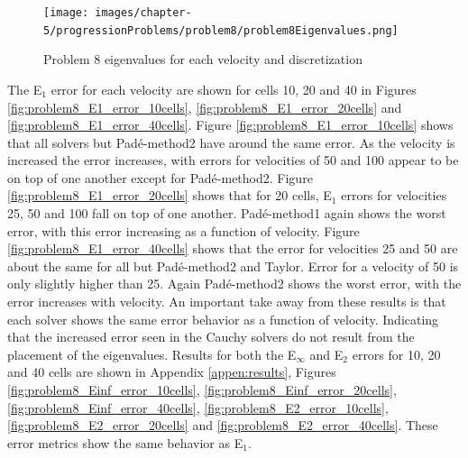 \clearpage

\begin{figure}[p]
    \centering
    \texttt{[image: images/chapter-5/progressionProblems/problem8/problem8Eigenvalues.png]}
    \caption{Problem 8 eigenvalues for each velocity and discretization}
    \label{fig:problem8_eigenvalues}
\end{figure}

\clearpage

The E${}_{1}$ error for each velocity are shown for cells 10, 20 and 40 in Figures \ref{fig:problem8_E1_error_10cells}, \ref{fig:problem8_E1_error_20cells} and \ref{fig:problem8_E1_error_40cells}. Figure \ref{fig:problem8_E1_error_10cells} shows that all solvers but Pad\'e-method2 have around the same error. As the velocity is increased the error increases, with errors for velocities of 50 and 100 appear to be on top of one another except for Pad\'e-method2. Figure \ref{fig:problem8_E1_error_20cells} shows that for 20 cells, E${}_{1}$ errors for velocities 25, 50 and 100 fall on top of one another. Pad\'e-method1 again shows the worst error, with this error increasing as a function of velocity. Figure \ref{fig:problem8_E1_error_40cells} shows that the error for velocities 25 and 50 are about the same for all but Pad\'e-method2 and Taylor. Error for a velocity of 50 is only slightly higher than 25. Again Pad\'e-method2 shows the worst error, with the error increases with velocity. An important take away from these results is that each solver shows the same error behavior as a function of velocity. Indicating that the increased error seen in the Cauchy solvers do not result from the placement of the eigenvalues. Results for both the E${}_{\infty}$ and E${}_{2}$ errors for 10, 20 and 40 cells are shown in Appendix \ref{appen:results}, Figures \ref{fig:problem8_Einf_error_10cells}, \ref{fig:problem8_Einf_error_20cells}, \ref{fig:problem8_Einf_error_40cells}, \ref{fig:problem8_E2_error_10cells}, \ref{fig:problem8_E2_error_20cells} and \ref{fig:problem8_E2_error_40cells}. These error metrics show the same behavior as E${}_{1}$. 

